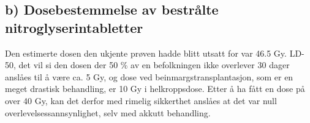 \documentclass[a4paper, 11pt, notitlepage]{article}
\begin{document}
\subsection{b) Dosebestemmelse av bestrålte nitroglyserintabletter}
Den estimerte dosen den ukjente prøven hadde blitt utsatt for var 46.5 Gy. LD-50, det vil si den dosen der 50 \% av en befolkningen ikke overlever 30 dager anslåes til å være ca. 5 Gy, og dose ved beinmargstransplantasjon, som er en meget drastisk behandling, er 10 Gy i helkroppsdose. Etter å ha fått en dose på over 40 Gy, kan det derfor med rimelig sikkerthet anslåes at det var null overlevelsessannsynlighet, selv med akkutt behandling.
\end{document}
